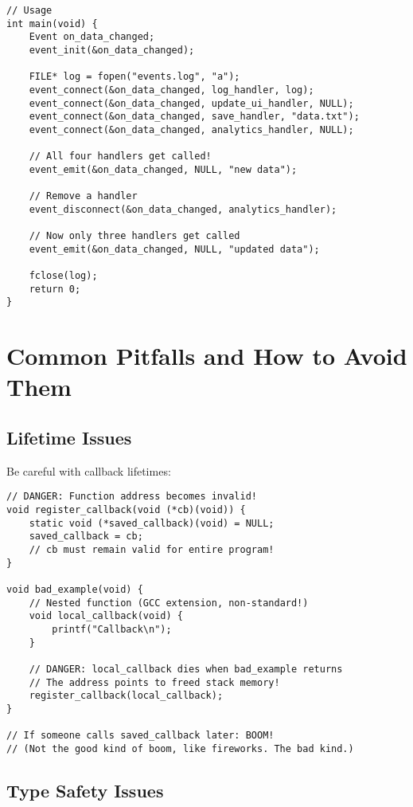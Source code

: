 \begin{lstlisting}
// Usage
int main(void) {
    Event on_data_changed;
    event_init(&on_data_changed);

    FILE* log = fopen("events.log", "a");
    event_connect(&on_data_changed, log_handler, log);
    event_connect(&on_data_changed, update_ui_handler, NULL);
    event_connect(&on_data_changed, save_handler, "data.txt");
    event_connect(&on_data_changed, analytics_handler, NULL);

    // All four handlers get called!
    event_emit(&on_data_changed, NULL, "new data");

    // Remove a handler
    event_disconnect(&on_data_changed, analytics_handler);

    // Now only three handlers get called
    event_emit(&on_data_changed, NULL, "updated data");

    fclose(log);
    return 0;
}
\end{lstlisting}

\section{Common Pitfalls and How to Avoid Them}

\subsection{Lifetime Issues}

\begin{warningbox}
Be careful with callback lifetimes:
\begin{lstlisting}
// DANGER: Function address becomes invalid!
void register_callback(void (*cb)(void)) {
    static void (*saved_callback)(void) = NULL;
    saved_callback = cb;
    // cb must remain valid for entire program!
}

void bad_example(void) {
    // Nested function (GCC extension, non-standard!)
    void local_callback(void) {
        printf("Callback\n");
    }

    // DANGER: local_callback dies when bad_example returns
    // The address points to freed stack memory!
    register_callback(local_callback);
}

// If someone calls saved_callback later: BOOM!
// (Not the good kind of boom, like fireworks. The bad kind.)
\end{lstlisting}
\end{warningbox}

\subsection{Type Safety Issues}


